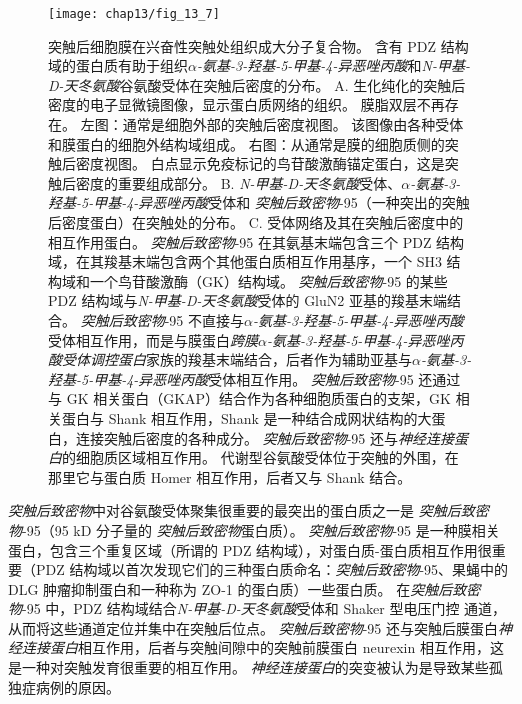 \begin{figure}[htbp]
	\centering
	\texttt{[image: chap13/fig\_13\_7]}
	\caption{突触后细胞膜在兴奋性突触处组织成大分子复合物。
		含有 PDZ 结构域的蛋白质有助于组织\textit{$\alpha$-氨基-3-羟基-5-甲基-4-异恶唑丙酸}和\textit{N-甲基-D-天冬氨酸}谷氨酸受体在突触后密度的分布\cite{sheng2007postsynaptic}。
		A. 生化纯化的突触后密度的电子显微镜图像，显示蛋白质网络的组织。
		膜脂双层不再存在。
		左图：通常是细胞外部的突触后密度视图。
		该图像由各种受体和膜蛋白的细胞外结构域组成。
		右图：从通常是膜的细胞质侧的突触后密度视图。
		白点显示免疫标记的鸟苷酸激酶锚定蛋白，这是突触后密度的重要组成部分。
		B. \textit{N-甲基-D-天冬氨酸}受体、\textit{$\alpha$-氨基-3-羟基-5-甲基-4-异恶唑丙酸}受体和 \textit{突触后致密物}-95（一种突出的突触后密度蛋白）在突触处的分布。
		C. 受体网络及其在突触后密度中的相互作用蛋白。
		\textit{突触后致密物}-95 在其氨基末端包含三个 PDZ 结构域，在其羧基末端包含两个其他蛋白质相互作用基序，一个 SH3 结构域和一个鸟苷酸激酶（GK）结构域。
		\textit{突触后致密物}-95 的某些 PDZ 结构域与\textit{N-甲基-D-天冬氨酸}受体的 GluN2 亚基的羧基末端结合。
		\textit{突触后致密物}-95 不直接与\textit{$\alpha$-氨基-3-羟基-5-甲基-4-异恶唑丙酸}受体相互作用，而是与膜蛋白\textit{跨膜$\alpha$-氨基-3-羟基-5-甲基-4-异恶唑丙酸受体调控蛋白}家族的羧基末端结合，后者作为辅助亚基与\textit{$\alpha$-氨基-3-羟基-5-甲基-4-异恶唑丙酸}受体相互作用。
		\textit{突触后致密物}-95 还通过与 GK 相关蛋白（GKAP）结合作为各种细胞质蛋白的支架，GK 相关蛋白与 Shank 相互作用，Shank 是一种结合成网状结构的大蛋白，连接突触后密度的各种成分。
		\textit{突触后致密物}-95 还与\textit{神经连接蛋白}的细胞质区域相互作用。
		代谢型谷氨酸受体位于突触的外围，在那里它与蛋白质 Homer 相互作用，后者又与 Shank 结合。}
	\label{fig:13_7}
\end{figure}


\textit{突触后致密物}中对谷氨酸受体聚集很重要的最突出的蛋白质之一是 \textit{突触后致密物}-95（95 kD 分子量的 \textit{突触后致密物}蛋白质）。
\textit{突触后致密物}-95 是一种膜相关蛋白，包含三个重复区域（所谓的 PDZ 结构域），对蛋白质-蛋白质相互作用很重要（PDZ 结构域以首次发现它们的三种蛋白质命名：\textit{突触后致密物}-95、果蝇中的 DLG 肿瘤抑制蛋白和一种称为 ZO-1 的蛋白质）一些蛋白质。
在\textit{突触后致密物}-95 中，PDZ 结构域结合\textit{N-甲基-D-天冬氨酸}受体和 Shaker 型电压门控  通道，从而将这些通道定位并集中在突触后位点。
\textit{突触后致密物}-95 还与突触后膜蛋白\textit{神经连接蛋白}相互作用，后者与突触间隙中的突触前膜蛋白 neurexin 相互作用，这是一种对突触发育很重要的相互作用。
\textit{神经连接蛋白}的突变被认为是导致某些孤独症病例的原因。


